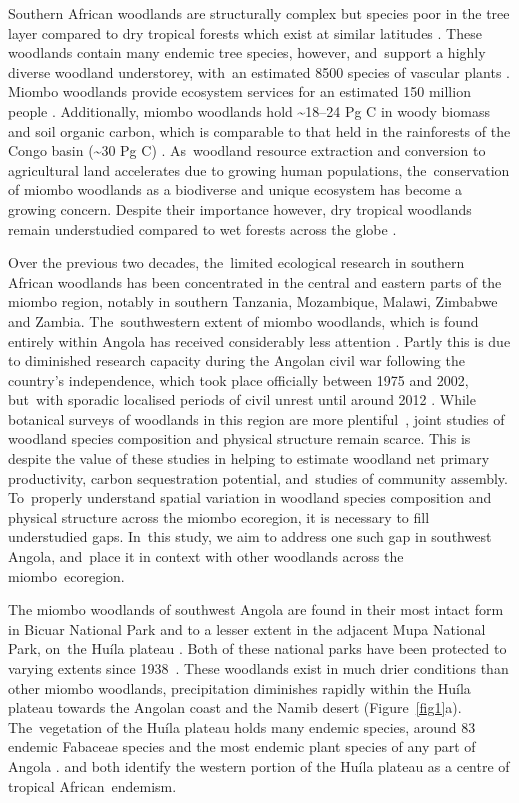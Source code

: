 \documentclass[diversity,article,accept,moreauthors,pdftex]{Definitions/mdpi}
\begin{document}
Southern African woodlands are structurally complex but species poor in the tree layer compared to dry tropical forests which exist at similar latitudes \citep{DRYFLOR2016, Torello-raventos2013}. These woodlands contain many endemic tree species, however, and~support a highly diverse woodland understorey, with~an estimated 8500 species of vascular plants \citep{Frost1996}. Miombo woodlands provide ecosystem services for an estimated 150 million people \citep{Ryan2016}. Additionally, miombo woodlands hold \textasciitilde{}18--24 Pg C in woody biomass and soil organic carbon, which is comparable to that held in the rainforests of the Congo basin (\textasciitilde{}30 Pg C) \citep{Mayaux2008}. As~woodland resource extraction and conversion to agricultural land accelerates due to growing human populations, the~conservation of miombo woodlands as a biodiverse and unique ecosystem has become a growing concern. Despite their importance however, dry tropical woodlands remain understudied compared to wet forests across the globe \citep{Clarke2017}. 

Over the previous two decades, the~limited ecological research in southern African woodlands has been concentrated in the central and eastern parts of the miombo region, notably in southern Tanzania, Mozambique, Malawi, Zimbabwe and Zambia. The~southwestern extent of miombo woodlands, which is found entirely within Angola has received considerably less attention \citep{Huntley2019}. Partly this is due to diminished research capacity during the Angolan civil war following the country's independence, which took place officially between 1975 and 2002, but~with sporadic localised periods of civil unrest until around 2012 \citep{Oliveira2015}. While botanical surveys of woodlands in this region are more plentiful~\mbox{\citep{Huntley2019, Figueiredo2009}}, joint studies of woodland species composition and physical structure remain scarce. This is despite the value of these studies in helping to estimate woodland net primary productivity, carbon sequestration potential, and~studies of community assembly. To~properly understand spatial variation in woodland species composition and physical structure across the miombo ecoregion, it is necessary to fill understudied gaps. In~this study, we aim to address one such gap in southwest Angola, and~place it in context with other woodlands across the miombo~ecoregion.

The miombo woodlands of southwest Angola are found in their most intact form in Bicuar National Park and to a lesser extent in the adjacent Mupa National Park, on~the Hu\'{i}la plateau \citep{Chisingui2018}. Both of these national parks have been protected to varying extents since 1938~\cite{Huntley2019}. These woodlands exist in much drier conditions than other miombo woodlands, precipitation diminishes rapidly within the Hu\'{i}la plateau towards the Angolan coast and the Namib desert (Figure~\ref{fig1}a). The~vegetation of the Hu\'{i}la plateau holds many endemic species, around 83 endemic Fabaceae species \citep{Soares2007} and the most endemic plant species of any part of Angola \citep{Figueiredo2008}. \citet{Linder2001} and \citet{Droissart2018} both identify the western portion of the Hu\'{i}la plateau as a centre of tropical African~endemism.
\end{document}
